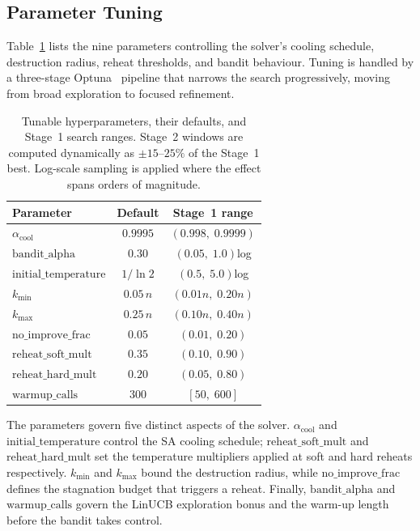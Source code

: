 \documentclass[conference]{IEEEtran}
\begin{document}
\subsection{Parameter Tuning}

Table~\ref{tab:tuning-params} lists the nine parameters controlling the solver's
cooling schedule, destruction radius, reheat thresholds, and bandit behaviour.
Tuning is handled by a three-stage Optuna~\cite{bAkiba} pipeline that narrows
the search progressively, moving from broad exploration to focused refinement.

\begin{table}[htbp]
	\caption{Tunable hyperparameters, their defaults, and Stage~1 search ranges.
		Stage~2 windows are computed dynamically as $\pm15$--$25\%$ of the Stage~1 best.
		Log-scale sampling is applied where the effect spans orders of magnitude.}
	\label{tab:tuning-params}
	\centering
	\small
	\begin{tabular}{l c c}
		\hline
		\textbf{Parameter}              & \textbf{Default} & \textbf{Stage~1 range} \\
		\hline
		$\alpha_{\mathrm{cool}}$        & $0.9995$         & $(0.998,\;0.9999)$     \\
		$\mathrm{bandit\_alpha}$        & $0.30$           & $(0.05,\;1.0)$\;log    \\
		$\mathrm{initial\_temperature}$ & $1/\ln 2$        & $(0.5,\;5.0)$\;log     \\
		$k_{\min}$                      & $0.05\,n$        & $(0.01n,\;0.20n)$      \\
		$k_{\max}$                      & $0.25\,n$        & $(0.10n,\;0.40n)$      \\
		$\mathrm{no\_improve\_frac}$    & $0.05$           & $(0.01,\;0.20)$        \\
		$\mathrm{reheat\_soft\_mult}$   & $0.35$           & $(0.10,\;0.90)$        \\
		$\mathrm{reheat\_hard\_mult}$   & $0.20$           & $(0.05,\;0.80)$        \\
		$\mathrm{warmup\_calls}$        & $300$            & $[50,\;600]$           \\
		\hline
	\end{tabular}
\end{table}

The parameters govern five distinct aspects of the solver.
$\alpha_{\mathrm{cool}}$ and $\mathrm{initial\_temperature}$ control the SA
cooling schedule; $\mathrm{reheat\_soft\_mult}$ and $\mathrm{reheat\_hard\_mult}$
set the temperature multipliers applied at soft and hard reheats respectively.
$k_{\min}$ and $k_{\max}$ bound the destruction radius, while
$\mathrm{no\_improve\_frac}$ defines the stagnation budget that triggers a reheat.
Finally, $\mathrm{bandit\_alpha}$ and $\mathrm{warmup\_calls}$ govern the LinUCB
exploration bonus and the warm-up length before the bandit takes control.
\end{document}

